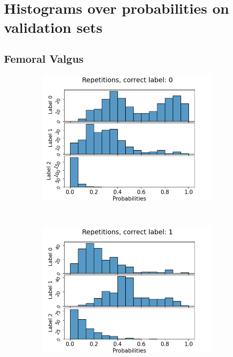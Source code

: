 \chapter{Histograms over probabilities on validation sets}
\section{Femoral Valgus}
\begin{figure}
  \begin{subfigure}[t]{0.3\textwidth}
    \includegraphics[width=\textwidth]{files/figs/app/hists/femval/r0.png}
  \end{subfigure}
  ~
  \begin{subfigure}[t]{0.3\textwidth}
    \includegraphics[width=\textwidth]{files/figs/app/hists/femval/r1.png}

\end{subfigure}
\end{figure}
